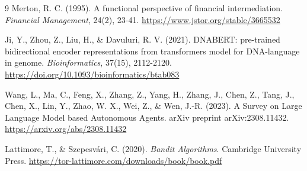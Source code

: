 \documentclass[11pt,a4paper]{article}
\begin{document}
{\small
\begin{thebibliography}{9}
Merton, R. C. (1995). A functional perspective of financial intermediation. 
\textit{Financial Management}, 24(2), 23-41. 
\url{https://www.jstor.org/stable/3665532}

Ji, Y., Zhou, Z., Liu, H., \& Davuluri, R. V. (2021). 
DNABERT: pre-trained bidirectional encoder representations from transformers model for DNA-language in genome. 
\textit{Bioinformatics}, 37(15), 2112-2120. 
\url{https://doi.org/10.1093/bioinformatics/btab083}

Wang, L., Ma, C., Feng, X., Zhang, Z., Yang, H., Zhang, J., Chen, Z., Tang, J., Chen, X., Lin, Y., Zhao, W. X., Wei, Z., \& Wen, J.-R. (2023). 
A Survey on Large Language Model based Autonomous Agents. 
arXiv preprint arXiv:2308.11432. 
\url{https://arxiv.org/abs/2308.11432}

Lattimore, T., \& Szepesvári, C. (2020). 
\textit{Bandit Algorithms}. 
Cambridge University Press. 
\url{https://tor-lattimore.com/downloads/book/book.pdf}

\end{thebibliography}
}
\end{document}
